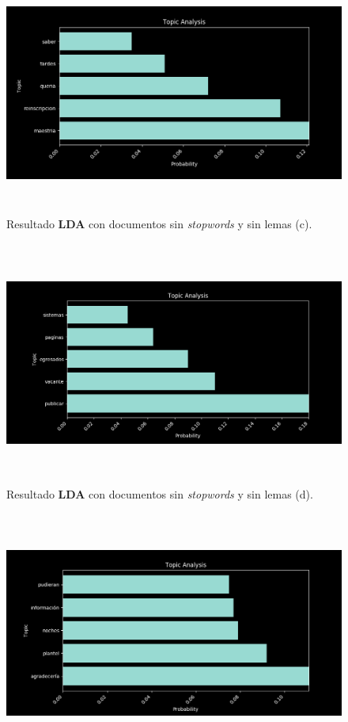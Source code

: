 \begin{itemize}
\begin{figure}[H]
        \end{figure}
        \begin{figure}[H]
            \centering
            \includegraphics[height=8cm, width=16.5cm]{Latex/Classes/Imagenes/ns_nl-3.png}
            \caption{Resultado \textbf{LDA} con documentos sin \textit{stopwords} y sin lemas (c).}
            \label{fig:ns_nl-3}
        \end{figure}
        \begin{figure}[H]
            \centering
            \includegraphics[height=8cm, width=16.5cm]{Latex/Classes/Imagenes/ns_nl-4.png}
            \caption{Resultado \textbf{LDA} con documentos sin \textit{stopwords} y sin lemas (d).}
            \label{fig:ns_nl-4}
        \end{figure}
        \begin{figure}[H]
            \centering
            \includegraphics[height=8cm, width=16.5cm]{Latex/Classes/Imagenes/ns_nl-5.png}

\end{figure}
\end{itemize}
